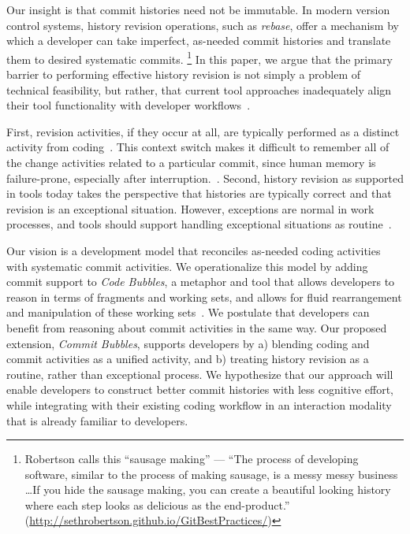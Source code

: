 \documentclass[conference]{IEEEtran}
\begin{document}
Our insight is that commit histories need not be immutable. 
In modern version control systems, history revision operations, such as \emph{rebase}, 
offer a mechanism by which a developer can take imperfect, as-needed commit histories and translate them to 
desired systematic commits.
\footnote{Robertson calls this ``sausage making'' --- ``The process of developing software, 
similar to the process of making sausage, is a messy messy business \ldots If you hide the sausage making, 
you can create a beautiful looking history where each step looks as delicious as the end-product.'' 
(\url{http://sethrobertson.github.io/GitBestPractices/})} 
In this paper, we argue that the primary barrier to performing effective history revision is not simply 
a problem of technical feasibility, but rather, that current tool approaches inadequately align their tool 
functionality with developer workflows~\cite{PerezDeRosso2013}.

First, revision activities, if they occur at all, are typically performed as a distinct activity from coding~\cite{Perry1989}. 
This context switch makes it difficult to remember all of the change activities related to a particular commit, 
since human memory is failure-prone, especially after interruption.~\cite{Parnin2012}. 
Second, history revision as supported in tools today takes the perspective that histories are typically correct and that 
revision is an exceptional situation. However, exceptions are normal in work processes, and tools should support handling 
exceptional situations as routine~\cite{Ackerman2000}.

Our vision is a development model that reconciles as-needed coding activities with systematic commit activities. 
We operationalize this model by adding commit support to \emph{Code Bubbles}, a metaphor and tool that allows developers 
to reason in terms of fragments and working sets, and allows for fluid rearrangement and manipulation of these working sets~\cite{Bragdon2010a}.
We postulate that developers can benefit from reasoning about commit activities in the same way. 
Our proposed extension, \emph{Commit Bubbles}, supports developers by a) blending coding and commit activities as a 
unified activity, and b) treating history revision as a routine, rather than exceptional process. 
We hypothesize that our approach will enable developers to construct better commit histories with less cognitive effort, 
while integrating with their existing coding workflow in an interaction modality that is already familiar to developers.
\end{document}
